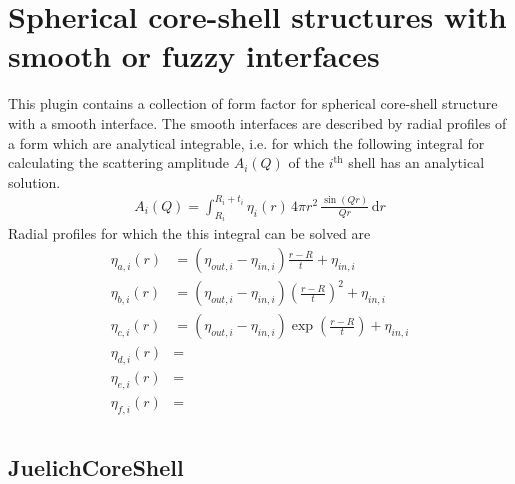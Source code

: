 \clearpage
\section{Spherical core-shell structures with smooth or fuzzy interfaces}
This plugin contains a collection of form factor for spherical core-shell structure with a smooth interface.
The smooth interfaces are described by radial profiles of a form which are analytical integrable, i.e. for which
the following integral for calculating the scattering amplitude $A_i(Q)$ of the $i^\textrm{th}$ shell
has an analytical solution.
\begin{align}
A_i(Q) = \int_{R_i}^{R_i+t_i} \eta_i(r)\, 4\pi r^2 \,\frac{\sin\left( Qr\right)}{Qr} \, \mathrm{d}r
\end{align}
Radial profiles for which the this integral can be solved are
\begin{subequations}
\begin{align}
\eta_{a,i}(r) &= \left(\eta_{out,i}-\eta_{in,i}\right)\frac{r-R}{t}+\eta_{in,i}\\
\eta_{b,i}(r) &= \left(\eta_{out,i}-\eta_{in,i}\right)\left(\frac{r-R}{t}\right)^2+\eta_{in,i}\\
\eta_{c,i}(r) &= \left(\eta_{out,i}-\eta_{in,i}\right)\exp\left(\frac{r-R}{t}\right)+\eta_{in,i}\\
\eta_{d,i}(r) &= \\
\eta_{e,i}(r) &= \\
\eta_{f,i}(r) &= \\
\end{align}
\end{subequations}



\clearpage
\subsection{JuelichCoreShell} ~\\

